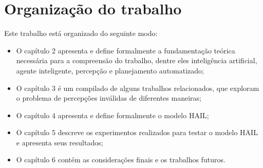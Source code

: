 \section{Organização do trabalho}

Este trabalho está organizado do seguinte modo:

\begin{itemize}
    \item O capítulo 2 apresenta e define formalmente a fundamentação teórica necessária para a compreensão do trabalho, dentre eles inteligência artificial, agente inteligente, percepção e planejamento automatizado;
    \item O capítulo 3 é um compilado de alguns trabalhos relacionados, que exploram o problema de percepções inválidas de diferentes maneiras;
    \item O capítulo 4 apresenta e define formalmente o modelo HAIL;
    \item O capítulo 5 descreve os experimentos realizados para testar o modelo HAIL e apresenta seus resultados;
    \item O capítulo 6 contém as considerações finais e os trabalhos futuros.
\end{itemize}
